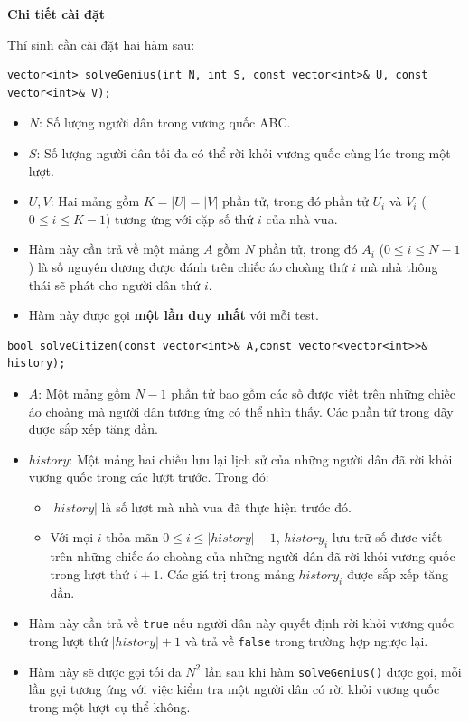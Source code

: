 \textbf{Chi tiết cài đặt}

Thí sinh cần cài đặt hai hàm sau:

\begin{lstlisting}
vector<int> solveGenius(int N, int S, const vector<int>& U, const vector<int>& V);
\end{lstlisting}

\begin{itemize}
   \item $N$: Số lượng người dân trong vương quốc ABC.
   \item $S$: Số lượng người dân tối đa có thể rời khỏi vương quốc cùng lúc trong một lượt.
   \item $U,V$: Hai mảng gồm $K=|U|=|V|$ phần tử, trong đó phần tử $U_i$ và $V_i$ ($0\le i\le K-1$) tương ứng với cặp số thứ $i$ của nhà vua.
   \item Hàm này cần trả về một mảng $A$ gồm $N$ phần tử, trong đó $A_i$ ($0\le i\le N-1$) là số nguyên dương được đánh trên chiếc áo choàng thứ $i$ mà nhà thông thái sẽ phát cho người dân thứ $i$.
   \item Hàm này được gọi \textbf{một lần duy nhất} với mỗi test.
\end{itemize}

\begin{lstlisting}
bool solveCitizen(const vector<int>& A,const vector<vector<int>>& history);
\end{lstlisting}

\begin{itemize}
   \item $A$: Một mảng gồm $N-1$ phần tử bao gồm các số được viết trên những chiếc áo choàng mà người dân tương ứng có thể nhìn thấy. Các phần tử trong dãy được sắp xếp tăng dần.
   \item $history$: Một mảng hai chiều lưu lại lịch sử của những người dân đã rời khỏi vương quốc trong các lượt trước. Trong đó:
   \begin{itemize}
      \item $|history|$ là số lượt mà nhà vua đã thực hiện trước đó.
      \item Với mọi $i$ thỏa mãn $0\le i\le |history|-1$, $history_i$ lưu trữ số được viết trên những chiếc áo choàng của những người dân đã rời khỏi vương quốc trong lượt thứ $i+1$. Các giá trị trong mảng $history_i$ được sắp xếp tăng dần.
   \end{itemize}
   \item Hàm này cần trả về \texttt{true} nếu người dân này quyết định rời khỏi vương quốc trong lượt thứ $|history|+1$ và trả về \texttt{false} trong trường hợp ngược lại.
   \item Hàm này sẽ được gọi tối đa $N^2$ lần sau khi hàm \texttt{solveGenius()} được gọi, mỗi lần gọi tương ứng với việc kiểm tra một người dân có rời khỏi vương quốc trong một lượt cụ thể không.
\end{itemize}

